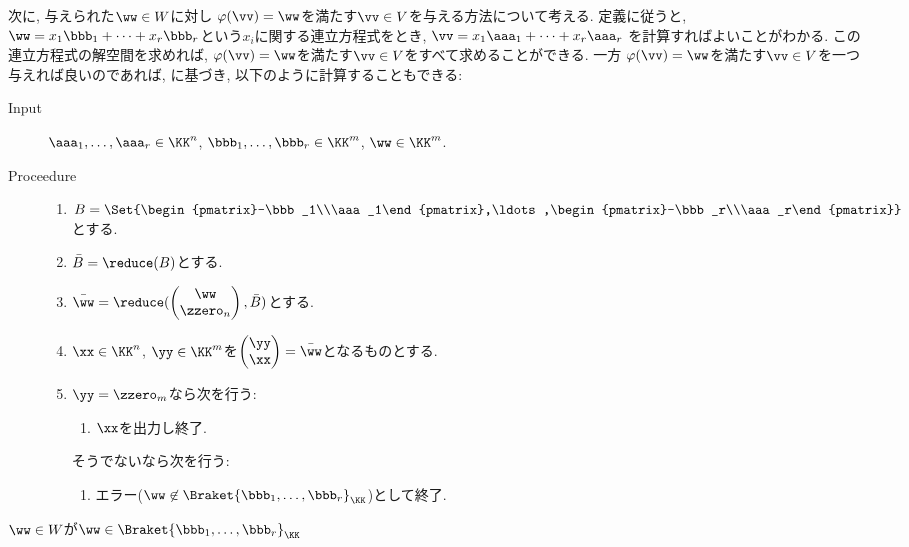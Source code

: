 次に, 与えられた$\ww\in W$に対し
$\varphi(\vv)=\ww$を満たす$\vv\in V$を与える方法について考える.
定義に従うと,
$\ww=x_1\bbb_1+\cdots+x_r\bbb_r$という$x_i$に関する連立方程式をとき,
$\vv=x_1\aaa_1+\cdots+x_r\aaa_r$
を計算すればよいことがわかる.
この連立方程式の解空間を求めれば,
$\varphi(\vv)=\ww$を満たす$\vv\in V$をすべて求めることができる.
一方
$\varphi(\vv)=\ww$を満たす$\vv\in V$を一つ与えれば良いのであれば,
に基づき,
以下のように計算することもできる:
\begin{algorithm}\makebox{}
\begin{description}
\item[Input]
$\aaa_1,\ldots,\aaa_r\in \KK^n$,
$\bbb_1,\ldots,\bbb_r\in \KK^m$,
$\ww\in \KK^m$.
\item[Proceedure]\makebox{}
  \begin{enumerate}
  \item $B=\Set{\begin{pmatrix}-\bbb_1\\\aaa_1\end{pmatrix},\ldots,\begin{pmatrix}-\bbb_r\\\aaa_r\end{pmatrix}}$とする.
  \item $\bar B=\reduce(B)$とする.
  \item $\bar \ww=\reduce(\begin{pmatrix}\ww\\\zzero_n\end{pmatrix},\bar B)$とする.
  \item $\xx\in\KK^n$, $\yy\in\KK^m$を$\begin{pmatrix}\yy\\\xx\end{pmatrix}=\bar \ww$となるものとする.
  \item
    $\yy= \zzero_m$なら次を行う:
    \begin{enumerate}
    \item $\xx$を出力し終了.
    \end{enumerate}
    そうでないなら次を行う:
    \begin{enumerate}
    \item エラー($\ww\not\in\Braket{\bbb_1,\ldots,\bbb_r}_{\KK}$)として終了.
    \end{enumerate}
  \end{enumerate}
\end{description}
\end{algorithm}
$\ww\in W$が$\ww\in\Braket{\bbb_1,\ldots,\bbb_r}_{\KK}$
